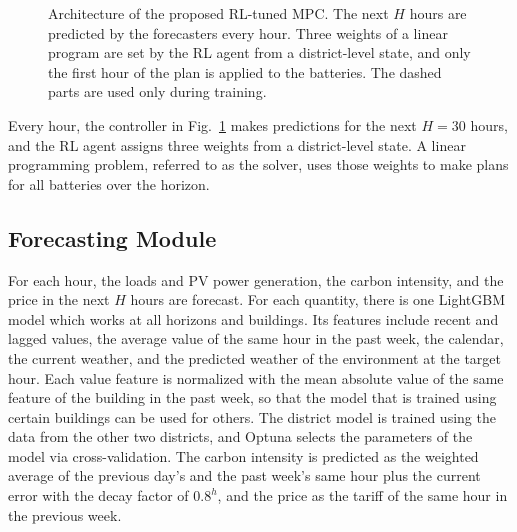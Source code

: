 \documentclass[conference]{IEEEtran}
\begin{document}
\begin{figure}[!t]
{}
\caption{Architecture of the proposed RL-tuned MPC. The next $H$ hours are predicted by the forecasters every hour. Three
weights of a linear program are set by the RL agent from a district-level state, and only the first hour of the plan is
applied to the batteries. The dashed parts are used only during training.}
\label{fig:arch}
\end{figure}

Every hour, the controller in Fig.~\ref{fig:arch} makes predictions for the next $H = 30$ hours, and the RL agent assigns
three weights from a district-level state. A linear programming problem, referred to as the solver, uses those weights
to make plans for all batteries over the horizon.

\subsection{Forecasting Module}\label{sec:fc}
For each hour, the loads and PV power generation, the carbon intensity, and the price in the next $H$ hours are forecast.
For each quantity, there is one LightGBM model \cite{ke2017lightgbm} which works at all horizons and buildings. Its
features include recent and lagged values, the average value of the same hour in the past week, the calendar, the current
weather, and the predicted weather of the environment at the target hour. Each value feature is normalized with the mean
absolute value of the same feature of the building in the past week, so that the model that is trained using certain
buildings can be used for others. The district model is trained using the data from the other two districts, and Optuna
\cite{akiba2019optuna} selects the parameters of the model via cross-validation. The carbon intensity is predicted as the
weighted average of the previous day's and the past week's same hour plus the current error with the decay factor of
$0.8^h$, and the price as the tariff of the same hour in the previous week.
\end{document}
